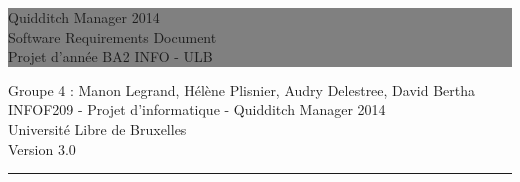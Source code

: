 \documentclass[a4paper,titlepage]{scrreprt}
\newcommand{\HRule}[1]{\hfill \rule{0.2\linewidth}{#1}} %
\begin{document}
\renewcommand{\glossaryname}{ }

\renewcommand{\indexname}{4 Index}




\thispagestyle{empty} %


\colorbox{grey}{
	\parbox[t]{1.0\linewidth}{
		\centering \fontsize{35pt}{80pt}\selectfont %
		\vspace*{0.7cm} %
		
		\hfill Quidditch Manager 2014 \\
		\hfill Software Requirements Document \\
		\hfill Projet d'année BA2 INFO - ULB\par
		
		\vspace*{0.7cm} %
	}
}


\vfill %


{\centering \large 
\hfill Groupe 4 : Manon Legrand, Hélène Plisnier, Audry Delestree, David Bertha \\
\hfill INFOF209 - Projet d'informatique - Quidditch Manager 2014 \\
\hfill Université Libre de Bruxelles \\
\hfill Version 3.0 \\

\HRule{1pt}} %


\clearpage %
\end{document}
